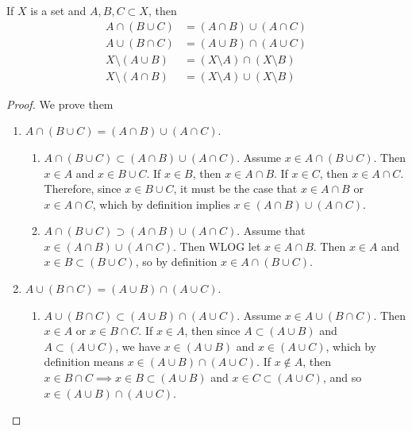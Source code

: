 \documentclass{article}
\begin{document}
    \begin{theorem}
      If $X$ is a set and $A,B,C \subset X$, then 
      \begin{align}
        A \cap (B \cup C) & = (A \cap B) \cup (A \cap C) \\
        A \cup (B \cap C) & = (A \cup B) \cap (A \cup C) \\ 
        X \setminus (A \cup B) & = (X \setminus A) \cap (X \setminus B) \\
        X \setminus (A \cap B) & = (X \setminus A) \cup (X \setminus B)
      \end{align}
    \end{theorem}
    \begin{proof}
      We prove them 
      \begin{enumerate}
        \item $A \cap (B \cup C) = (A \cap B) \cup (A \cap C)$. 
          \begin{enumerate}
            \item $A \cap (B \cup C) \subset (A \cap B) \cup (A \cap C)$. Assume $x \in A \cap (B \cup C)$. Then $x \in A$ and $x \in B \cup C$. If $x \in B$, then $x \in A \cap B$. If $x \in C$, then $x \in A \cap C$. Therefore, since $x \in B \cup C$, it must be the case that $x \in A \cap B$ or $x \in A \cap C$, which by definition implies $x \in (A \cap B) \cup (A \cap C)$. 

            \item $A \cap (B \cup C) \supset (A \cap B) \cup (A \cap C)$. Assume that $x \in (A \cap B) \cup (A \cap C)$. Then WLOG let $x \in A \cap B$. Then $x \in A$ and $x \in B \subset (B \cup C)$, so by definition $x \in A \cap (B \cup C)$. 
          \end{enumerate}

        \item $A \cup (B \cap C) = (A \cup B) \cap (A \cup C)$.
          \begin{enumerate}
            \item $A \cup (B \cap C) \subset (A \cup B) \cap (A \cup C)$. Assume $x \in A \cup(B \cap C)$. Then $x \in A$ or $x \in B \cap C$. If $x \in A$, then since $A \subset (A \cup B)$ and $A \subset (A \cup C)$, we have $x \in (A \cup B)$ and $x \in (A \cup C)$, which by definition means $x \in (A \cup B) \cap (A \cup C)$. If $x \not\in A$, then $x \in B \cap C \implies x \in B \subset (A \cup B)$ and $x \in C \subset (A \cup C)$, and so $x \in (A \cup B) \cap (A \cup C)$. 


\end{enumerate}
\end{enumerate}
\end{proof}
\end{document}
